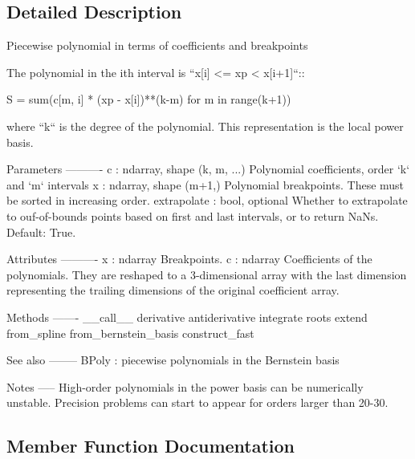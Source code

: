 \subsection{Detailed Description}
\begin{DoxyVerb}Piecewise polynomial in terms of coefficients and breakpoints

The polynomial in the ith interval is ``x[i] <= xp < x[i+1]``::

    S = sum(c[m, i] * (xp - x[i])**(k-m) for m in range(k+1))

where ``k`` is the degree of the polynomial. This representation
is the local power basis.

Parameters
----------
c : ndarray, shape (k, m, ...)
    Polynomial coefficients, order `k` and `m` intervals
x : ndarray, shape (m+1,)
    Polynomial breakpoints. These must be sorted in
    increasing order.
extrapolate : bool, optional
    Whether to extrapolate to ouf-of-bounds points based on first
    and last intervals, or to return NaNs. Default: True.

Attributes
----------
x : ndarray
    Breakpoints.
c : ndarray
    Coefficients of the polynomials. They are reshaped
    to a 3-dimensional array with the last dimension representing
    the trailing dimensions of the original coefficient array.

Methods
-------
__call__
derivative
antiderivative
integrate
roots
extend
from_spline
from_bernstein_basis
construct_fast

See also
--------
BPoly : piecewise polynomials in the Bernstein basis

Notes
-----
High-order polynomials in the power basis can be numerically
unstable.  Precision problems can start to appear for orders
larger than 20-30.\end{DoxyVerb}
 

\subsection{Member Function Documentation}
\hypertarget{classscipy_1_1interpolate_1_1interpolate_1_1PPoly_a5e23c9feb5fbfb60c2ae087066c23878}{}
